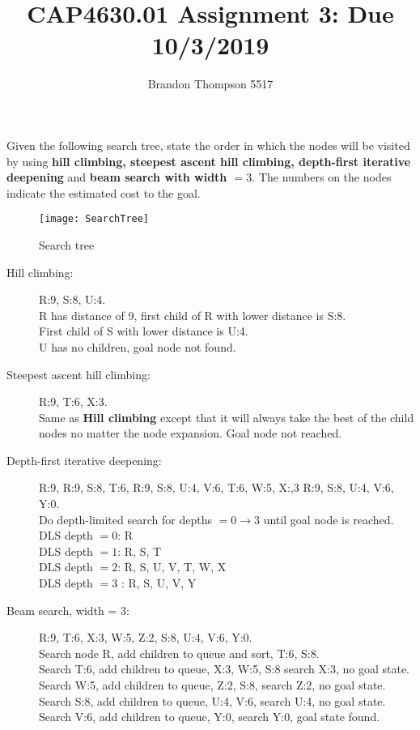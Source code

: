 \documentclass[a4paper]{article}
\begin{document}
	\title{CAP4630.01 Assignment 3: Due 10/3/2019}
	\author{Brandon Thompson 5517}
	\maketitle
	\medskip
	Given the following search tree, state the order in which the nodes will be visited by
	using \textbf{hill climbing, steepest ascent hill climbing, depth-first iterative
	deepening} and \textbf{beam search with width $= 3$}. The numbers on the nodes indicate
	the estimated cost to the goal.

	\begin{figure}[ht!]
		\centering
		\texttt{[image: SearchTree]}
		\caption{Search tree}
		\label{fig:st}
	\end{figure}
	\begin{description}
		\item[Hill climbing:] R:9, S:8, U:4.\\
			R has distance of 9, first child of R with lower distance is S:8.\\
			First child of S with lower distance is U:4.\\
			U has no children, goal node not found.
		\item[Steepest ascent hill climbing:] R:9, T:6, X:3.\\
			Same as \textbf{Hill climbing} except that it will always take the best of the child nodes
			no matter the node expansion. Goal node not reached.
		\pagebreak
		\item[Depth-first iterative deepening:] R:9, R:9, S:8, T:6, R:9, S:8, U:4, V:6, T:6, W:5, X:,3
			R:9, S:8, U:4, V:6, Y:0.\\
			Do depth-limited search for depths $=0 \to 3$ until goal node is reached.\\
			DLS depth $=0$: R\\
			DLS depth $=1$: R, S, T\\
			DLS depth  $=2$: R, S, U, V, T, W, X\\
			DLS depth  $=3$ : R, S, U, V, Y
		\item[Beam search, width = 3:] R:9, T:6, X:3, W:5, Z:2, S:8, U:4, V:6, Y:0.\\
			Search node R, add children to queue and sort, T:6, S:8.\\
			Search T:6, add children to queue, X:3, W:5, S:8 search X:3, no goal state.\\
			Search W:5, add children to queue, Z:2, S:8, search Z:2, no goal state.\\
			Search S:8, add children to queue, U:4, V:6, search U:4, no goal state.\\
			Search V:6, add children to queue, Y:0, search Y:0, goal state found.
	\end{description}
\end{document}

